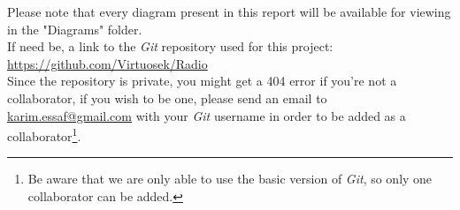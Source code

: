 \documentclass[11pt]{article}
\begin{document}
\pagebreak
{}
\vspace*{\fill}
\begin{center}
Please note that every diagram present in this report will be available for viewing in the "Diagrams" folder.\\\vspace{30px}
If need be, a link to the \textit{Git} repository used for this project:\\
\url{https://github.com/Virtuosek/Radio}\\
Since the repository is private, you might get a 404 error if you're not a collaborator, if you wish to be one, please send an email to \href{mailto:karim.essaf@gmail.com}{karim.essaf@gmail.com} with your \textit{Git} username in order to be added as a collaborator\footnote{Be aware that we are only able to use the basic version of \textit{Git}, so only one collaborator can be added.}.
\end{center}
\vspace*{\fill}
\end{document}
